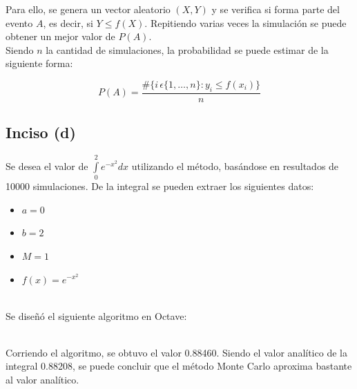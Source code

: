 \documentclass[a4paper]{article}
\begin{document}
Para ello, se genera un vector aleatorio $(X,Y)$ y se verifica si forma
parte del evento $A$, es decir, si $Y \leqslant f(X)$. Repitiendo varias veces
la simulación se puede obtener un mejor valor de $P(A)$. \\

Siendo $n$ la cantidad de simulaciones, la probabilidad se puede estimar de la 
siguiente forma:

\[
  P(A) = \frac{ \#\{
      i \, \epsilon \{ 1, \dots, n \} : y_i \leqslant f(x_i) \}
    }{ n }
\]

\newpage
\subsection*{Inciso (d)}
Se desea el valor de $\int\limits_0^2 e^{-x^2} dx$ utilizando el método,
basándose en resultados de 10000 simulaciones.
De la integral se pueden extraer los siguientes datos:

\begin{itemize}
\item $a = 0$
\item $b = 2$
\item $M = 1$
\item $f(x) = e^{-x^2}$
\end{itemize}
~\\

Se diseñó el siguiente algoritmo en Octave:


~\\

Corriendo el algoritmo, se obtuvo el valor 0.88460.
Siendo el valor analítico de la integral 0.88208, se puede concluir que el
método Monte Carlo aproxima bastante al valor analítico.
\end{document}
